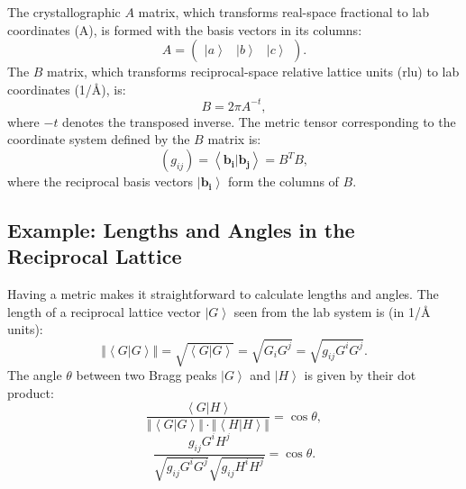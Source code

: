 \documentclass[english]{book}
\begin{document}
The crystallographic $A$ matrix, which transforms real-space fractional to lab coordinates (A), is formed with the basis vectors in its columns:
\begin{equation}
	A = \left(
		\begin{array}{ccc}
			\left| a \right> & \left| b \right> & \left| c \right>
		\end{array}
	\right).
\end{equation}
The $B$ matrix, which transforms reciprocal-space relative lattice units (rlu) to lab coordinates (1/\AA), is:
\begin{equation} B = 2 \pi A^{-t}, \end{equation}
where $-t$ denotes the transposed inverse.
The metric tensor corresponding to the coordinate system defined by the $B$ matrix is:
\begin{equation} \left(g_{ij}\right) = \left<\bm{b_i} | \bm{b_j} \right> = B^T B, \end{equation}
where the reciprocal basis vectors $\left| \bm{b_i} \right>$ form the columns of $B$.


\subsection*{Example: Lengths and Angles in the Reciprocal Lattice}
Having a metric makes it straightforward to calculate lengths and angles.
The length of a reciprocal lattice vector $\left| G \right>$ seen from the lab system is (in 1/\AA{} units):
\begin{equation}
	\left\Vert \left< G | G \right> \right\Vert = \sqrt{\left< G | G \right>} = \sqrt{G_i G^j} = \sqrt{g_{ij} G^i G^j}.
\end{equation}
The angle $\theta$ between two Bragg peaks $\left| G \right>$ and $\left| H \right>$ is given by their dot product:
\begin{equation}
	\frac{\left< G | H \right>}{\left\Vert \left< G | G \right> \right\Vert \cdot \left\Vert \left< H | H \right> \right\Vert} = \cos \theta,
\end{equation}
\begin{equation}
	\frac{g_{ij} G^i H^j }{\sqrt{g_{ij} G^i G^j} \sqrt{g_{ij} H^i H^j}} = \cos \theta.
\end{equation}
\end{document}
